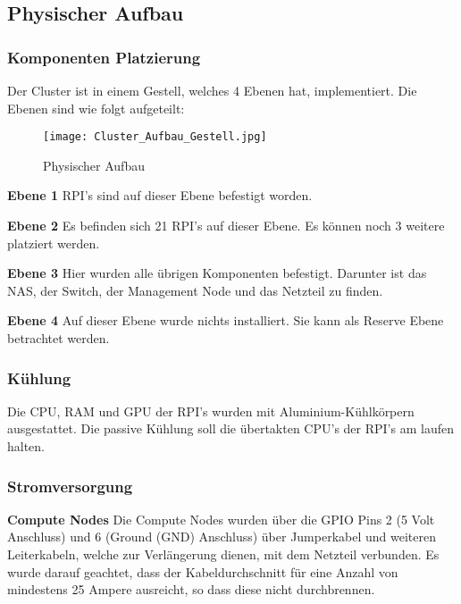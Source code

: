 \subsection{Physischer Aufbau}

\subsubsection{Komponenten Platzierung}
Der Cluster ist in einem Gestell, welches 4 Ebenen hat, implementiert. Die Ebenen sind wie folgt aufgeteilt: \newline

\begin{figure}[htb]
\centering
\texttt{[image: Cluster\_Aufbau\_Gestell.jpg]}
\caption{Physischer Aufbau}
\label{fig:Physischer Aufbau}
\end{figure} 

\textbf{Ebene 1} RPI's sind auf dieser Ebene befestigt worden.

\textbf{Ebene 2}\newline
Es befinden sich 21 RPI's auf dieser Ebene. Es können noch 3 weitere platziert werden.

\textbf{Ebene 3}\newline
Hier wurden alle übrigen Komponenten befestigt. Darunter ist das NAS, der Switch, der Management Node und das Netzteil zu finden.

\textbf{Ebene 4}\newline
Auf dieser Ebene wurde nichts installiert. Sie kann als Reserve Ebene betrachtet werden.

\subsubsection{Kühlung}
Die CPU, RAM und GPU der RPI's wurden mit Aluminium-Kühlkörpern ausgestattet. Die passive Kühlung soll die übertakten CPU's der RPI's am laufen halten.

\subsubsection{Stromversorgung}
\textbf{Compute Nodes}\newline
Die Compute Nodes wurden über die GPIO Pins 2 (5 Volt Anschluss) und 6 (Ground (GND) Anschluss) über Jumperkabel und weiteren Leiterkabeln, welche zur Verlängerung dienen, mit dem Netzteil verbunden. Es wurde darauf geachtet, dass der Kabeldurchschnitt für eine Anzahl von mindestens 25 Ampere ausreicht, so dass diese nicht durchbrennen.

